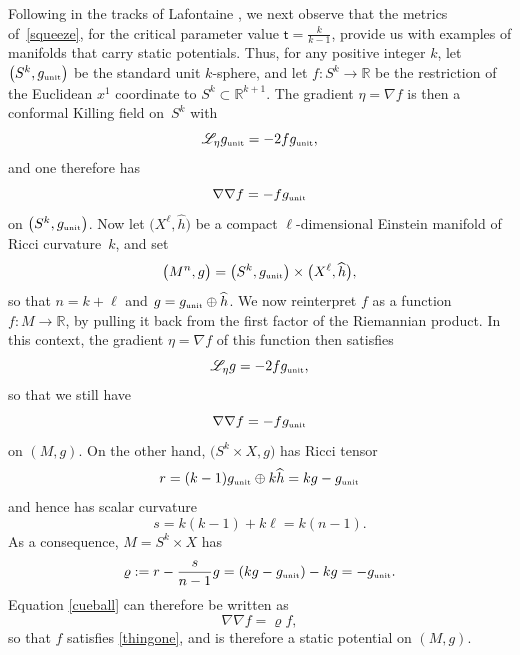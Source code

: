 \documentclass[10pt,a4paper]{amsart}
\numberwithin{equation}{section}
\def\RR{\mathbb{R}}
\begin{document}
Following in the tracks of Lafontaine \cite[Section~B]{lafontaine}, we next observe
that the metrics of~\eqref{squeeze}, for the critical parameter value $\mathsf{t}= \frac{k}{k-1}$,
provide us with examples of manifolds that carry static potentials.
Thus, for any positive integer $k$, let $\big(S^k, g_{\text{\tiny unit}}\big)$ be the standard
unit $k$-sphere, and let $f\colon S^k \to \RR$ be the restriction of the Euclidean $x^1$ coordinate to $S^k \subset \RR^{k+1}$.
The gradient $\eta= \nabla f$ is then a conformal Killing field on~$S^k$ with
\begin{equation*}
\mathscr{L}_\eta g_{\text{\tiny unit}} = -2f g_{\text{\tiny unit}},
\end{equation*}
and one therefore has
\begin{equation*}
\nabla \nabla f = - f g_{\text{\tiny unit}}
\end{equation*}
on $\big(S^k, g_{\text{\tiny unit}}\big)$. Now let $\big(X^{\ell}, \widehat{h}\big)$ be a compact $\ell$-dimensional Einstein manifold of Ricci curvature~$k$,
and set
\begin{equation*}
\big(M^{n}, g\big) = \big(S^k, g_{\text{\tiny unit}}\big) \times \big(X^\ell, \widehat{h}\big),
\end{equation*}
so that $n = k+\ell$ and $g=g_{\text{\tiny unit}} \oplus \widehat{h}$.
We now reinterpret $f$ as a function $f\colon M \to \RR$, by pulling it back from the first factor
of the Riemannian product. In this context, the gradient $\eta= \nabla f$ of this function
then satisfies
\begin{equation*}
\mathscr{L}_\eta g = -2f g_{\text{\tiny unit}},
\end{equation*}
so that we still have
\begin{equation}
\label{cueball}
\nabla \nabla f = - f g_{\text{\tiny unit}}
\end{equation}
on $(M, g)$. On the other hand, $\big(S^k \times X,g\big)$ has Ricci tensor
\begin{equation*}
r = (k-1) g_{\text{\tiny unit}} \oplus k \widehat{h}=kg-g_{\text{\tiny unit}}
\end{equation*}
and hence has scalar curvature
\begin{equation*}
s = k(k-1) + k\ell = k (n-1).
\end{equation*}
As a consequence, $M=S^k \times X$ has
\begin{equation*}
\varrho := r - \frac{s}{n-1}g= (k g - g_{\text{\tiny unit}}) - k g = -g_{\text{\tiny unit}}.
\end{equation*}
Equation \eqref{cueball} can therefore be written as
\begin{equation*}
\nabla \nabla f = \varrho f,
\end{equation*}
so that $f$ satisfies \eqref{thingone}, and is therefore a static potential on $(M,g)$.
\end{document}
